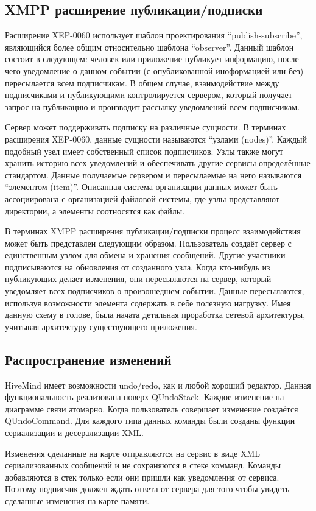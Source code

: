 \subsection{XMPP расширение публикации/подписки}
Расширение XEP-0060 использует шаблон проектирования ``publish-subscribe'',
являющийся более общим относительно шаблона ``observer''. Данный шаблон состоит
в следующем: человек или приложение публикует информацию, после чего уведомление
о данном событии (с опубликованной иноформацией или без) пересылается всем
подписчикам. В общем случае, взаимодействие между подписчиками и публикующими
контролируется сервером, который получает запрос на публикацию и производит
рассылку уведомлений всем подписчикам.

Сервер может поддерживать подписку на различные сущности. В терминах расширения
XEP-0060, данные сущности называются ``узлами (nodes)''. Каждый подобный узел
имеет собственный список подписчиков. Узлы также могут хранить историю всех
уведомлений и обеспечивать другие сервисы определённые стандартом. Данные
получаемые сервером и пересылаемые на него называются ``элементом (item)''.
Описанная система организации данных может быть ассоциирована с организацией
файловой системы, где узлы представляют директории, а элементы соотносятся как
файлы.

В терминах XMPP расширения публикации/подписки процесс взаимодействия может быть
представлен следующим образом. Пользователь создаёт сервер с единственным узлом
для обмена и хранения сообщений. Другие участники подписываются на обновления от
созданного узла. Когда кто-нибудь из публикующих делает изменения, они
пересылаются на сервер, который уведомляет всех подписчиков о произошедшем
событии. Данные пересылаются, используя возможности элемента содержать в себе
полезную нагрузку. Имея данную схему в голове, была начата детальная проработка
сетевой архитектуры, учитывая архитектуру существующего приложения.

\subsection{Распространение изменений}

HiveMind имеет возможности undo/redo, как и любой хороший редактор. Данная функциональность реализована поверх QUndoStack. Каждое изменение на диаграмме связи атомарно. Когда пользователь совершает изменение создаётся QUndoCommand. Для каждого типа данных команды были созданы функции сериализации и десерализации XML.

Изменения сделанные на карте отправляются на сервис в виде XML сериализованных сообщений и не сохраняются в стеке комманд. Команды добавляются в стек только если они пришли как уведомления от сервиса. Поэтому подписчик должен ждать ответа от сервера для того чтобы увидеть сделанные изменения на карте памяти.


